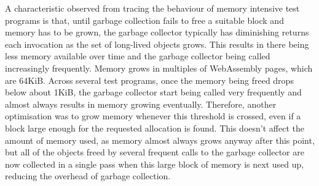 
A characteristic observed from tracing the behaviour of memory intensive test programs is that, until garbage collection fails to free a suitable block and memory has to be grown, the garbage collector typically has diminishing returns each invocation as the set of long-lived objects grows. This results in there being less memory available over time and the garbage collector being called increasingly frequently. Memory grows in multiples of WebAssembly pages, which are 64KiB. Across several test programs, once the memory being freed drops below about 1KiB, the garbage collector start being called very frequently and almost always results in memory growing eventually. Therefore, another optimisation was to grow memory whenever this threshold is crossed, even if a block large enough for the requested allocation is found. This doesn't affect the amount of memory used, as memory almost always grows anyway after this point, but all of the objects freed by several frequent calls to the garbage collector are now collected in a single pass when this large block of memory is next used up, reducing the overhead of garbage collection.










